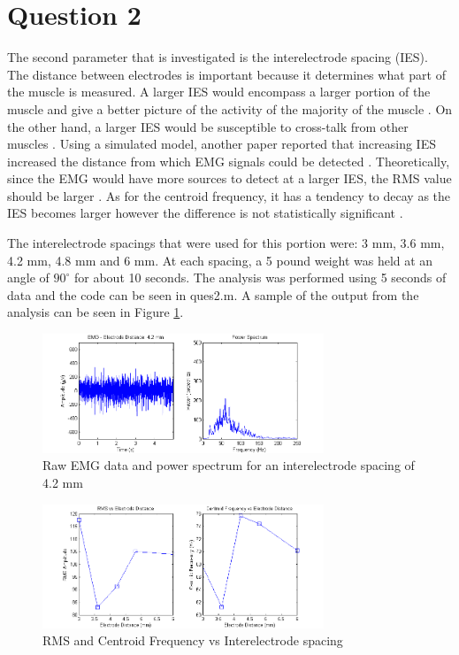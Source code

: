 \documentclass[11pt]{article}
\numberwithin{equation}{section}	%
\begin{document}
\section*{Question 2}
The second parameter that is investigated is the interelectrode spacing (IES). The distance between electrodes is important because it determines what part of the muscle is measured. A larger IES would encompass a larger portion of the muscle and give a better picture of the activity of the majority of the muscle \cite{Beck2005}. On the other hand, a larger IES would be susceptible to cross-talk from other muscles \cite{Beck2005}. Using a simulated model, another paper reported that increasing IES increased the distance from which EMG signals could be detected \cite{Fuglevand1992}. Theoretically, since the EMG would have more sources to detect at a larger IES, the RMS value should be larger \cite{Beck2005, Alemu2003}. As for the centroid frequency, it has a tendency to decay as the IES becomes larger however the difference is not statistically significant \cite{Beck2005}. 

The interelectrode spacings that were used for this portion were: 3 mm, 3.6 mm, 4.2 mm, 4.8 mm and 6 mm. At each spacing, a 5 pound weight was held at an angle of \(90^\circ\) for about 10 seconds. The analysis was performed using 5 seconds of data and the code can be seen in ques2.m. A sample of the output from the analysis can be seen in Figure \ref{fig2a}.

\begin{figure}[!ht]
  \centering
    \includegraphics[width=0.75\textwidth]{fig2a}
	\caption{Raw EMG data and power spectrum for an interelectrode spacing of 4.2 mm}
	\label{fig2a}
\end{figure}
\begin{figure}[!ht]
  \centering
    \includegraphics[width=0.75\textwidth]{fig2b}
	\caption{RMS and Centroid Frequency vs Interelectrode spacing}
	\label{fig2b}
\end{figure}
\end{document}

